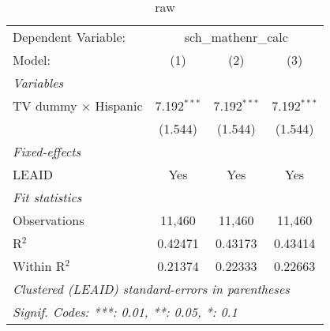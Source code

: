 \begin{table}[htbp]
\centering
\caption{ raw}
\begin{tabular}{lccc}
\tabularnewline\midrule\midrule
Dependent Variable:&\multicolumn{3}{c}{sch\_mathenr\_calc}\\
Model:&(1) & (2) & (3)\\
\midrule \emph{Variables}&   &   &  \\
TV dummy $\times$ Hispanic & 7.192$^{***}$ & 7.192$^{***}$ & 7.192$^{***}$\\
  &(1.544) & (1.544) & (1.544)\\
\midrule \emph{Fixed-effects}&   &   &  \\
LEAID & Yes & Yes & Yes\\
\midrule \emph{Fit statistics}&  & & \\
Observations & 11,460&11,460&11,460\\
R$^2$ & 0.42471&0.43173&0.43414\\
Within R$^2$ & 0.21374&0.22333&0.22663\\
\midrule\midrule\multicolumn{4}{l}{\emph{Clustered (LEAID) standard-errors in parentheses}}\\
\multicolumn{4}{l}{\emph{Signif. Codes: ***: 0.01, **: 0.05, *: 0.1}}\\
\end{tabular}
\end{table}

